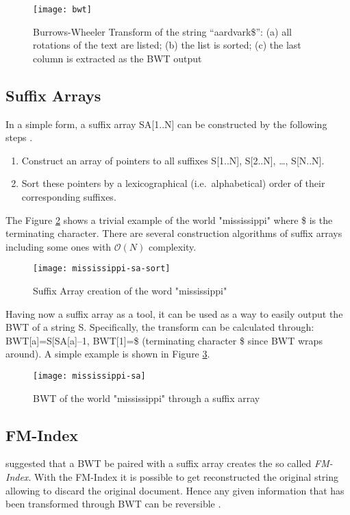 \begin{figure}[h]
    \centering
    \texttt{[image: bwt]}
    \caption{Burrows-Wheeler Transform of the string “aardvark\$”: (a) all rotations of the text are listed; (b) the list is sorted; (c) the last column is extracted as the BWT output \cite{adjeroh_bell_mukherjee_2008}}
    \label{fig:bwt}
\end{figure}

\subsection{Suffix Arrays}
In a simple form, a suffix array SA[1..N] can be constructed by the following steps \cite{Puglisi}.
\begin{enumerate}
	\item Construct an array of pointers to all suffixes S[1..N], S[2..N], \ldots, S[N..N].
	\item Sort these pointers by a lexicographical (i.e.\ alphabetical) order of their corresponding suffixes.
\end{enumerate}

The Figure \ref{fig:sa} shows a trivial example of the world "mississippi" where \$ is the terminating character. There are several construction algorithms of suffix arrays including some ones with \(\mathcal{O}(N)\) complexity.

\begin{figure}[h]
    \centering
    \texttt{[image: mississippi-sa-sort]}
    \caption{Suffix Array creation of the word "mississippi"}
    \label{fig:sa}
\end{figure}

Having now a suffix array as a tool, it can be used as a way to easily output the BWT of a string S. Specifically, the transform can be calculated through: BWT[a]=S[SA[a]–1, BWT[1]=\$ (terminating character \$ since BWT wraps around). A simple example is shown in Figure \ref{fig:bwt_sa}.

\begin{figure}[h]
    \centering
    \texttt{[image: mississippi-sa]}
    \caption{BWT of the world "mississippi" through a suffix array}
    \label{fig:bwt_sa}
\end{figure}


\subsection{FM-Index}
\citeauthor{Ferragina} \citeyear{Ferragina} suggested that a BWT be paired with a suffix array creates the so called \emph{FM-Index}. With the FM-Index it is possible to get reconstructed the original string allowing to discard the original document. Hence any given information that has been transformed through BWT can be reversible \cite{Ferragina}.
